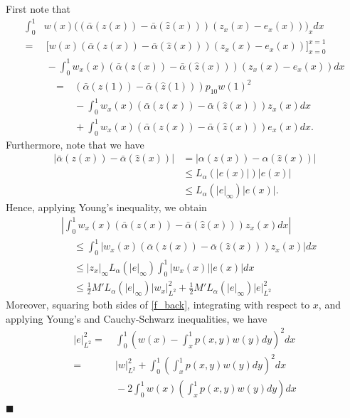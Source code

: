 \documentclass[twocolumn]{autart}
\newenvironment{proof}{{\it Proof. }}{\hfill $\blacksquare$ }
\begin{document}
\begin{proof}
First note that 
\begin{align}
\int_{0}^{1}&w(x)\big(\left(\bar{\alpha}(z(x))-\bar{\alpha}(\hat{z}(x))\right)(z_x(x)-e_x(x))\big)_x dx \nonumber \\
=&~ \bigg[w(x)\left(\bar{\alpha}(z(x))-\bar{\alpha}(\hat{z}(x))\right)(z_x(x)-e_x(x))\bigg]_{x=0}^{x=1} \nonumber\\
&~-\int_{0}^{1}w_x(x)\left(\bar{\alpha}(z(x))-\bar{\alpha}(\hat{z}(x))\right)(z_x(x)-e_x(x))dx \nonumber 
\end{align}
\begin{align}
=&~\left(\bar{\alpha}(z(1))-\bar{\alpha}(\hat{z}(1))\right)p_{10}w(1)^2 \nonumber\\
&~-\int_{0}^{1}w_x(x)\left(\bar{\alpha}(z(x))-\bar{\alpha}(\hat{z}(x))\right)z_x(x)dx \nonumber \\
&~+\int_{0}^{1}w_x(x)\left(\bar{\alpha}(z(x))-\bar{\alpha}(\hat{z}(x))\right)e_x(x)dx. \label{first_1}
\end{align}
Furthermore, note that we have
\begin{align*}
|\bar{\alpha}(z(x))-\bar{\alpha}(\hat{z}(x))| &= |\alpha(z(x))-\alpha(\hat{z}(x))|\\
&\leq L_{\alpha}(|e(x)|)|e(x)| \\
&\leq L_{\alpha}(|e|_{\infty})|e(x)|. 
\end{align*}
Hence, applying Young's inequality, we obtain
\begin{align*}
&\left|\int_{0}^{1}w_x(x)\left(\bar{\alpha}(z(x))-\bar{\alpha}(\hat{z}(x))\right)z_x(x)dx\right| \\
&~\quad \leq \int_{0}^{1}\left|w_x(x)\left(\bar{\alpha}(z(x))-\bar{\alpha}(\hat{z}(x))\right)z_x(x)\right|dx \\
&~\quad \leq |z_x|_{\infty}L_{\alpha}(|e|_{\infty})\int_{0}^{1}|w_x(x)| |e(x)|dx \\
&~\quad \leq \frac{1}{2}M'L_{\alpha}(|e|_{\infty})|w_x|_{L^2}^2 + \frac{1}{2}M'L_{\alpha}(|e|_{\infty})|e|_{L^2}^2
\end{align*}
Moreover, squaring both sides of \eqref{f_back}, integrating with respect to $x$, and applying Young's and Cauchy-Schwarz inequalities, we have 
\begin{align}
|e|_{L^2}^2 =&~ \int_{0}^{1}\left(w(x) - \int_x^1 p(x,y)w(y)dy\right)^2dx \nonumber \\ 
=&~ |w|_{L^2}^2+\int_{0}^{1}\left(\int_x^1 p(x,y)w(y)dy\right)^2dx \nonumber\\
&~-2\int_{0}^{1}w(x)\left(\int_x^1 p(x,y)w(y)dy\right)dx\nonumber 

\end{align}
\end{proof}
\end{document}
